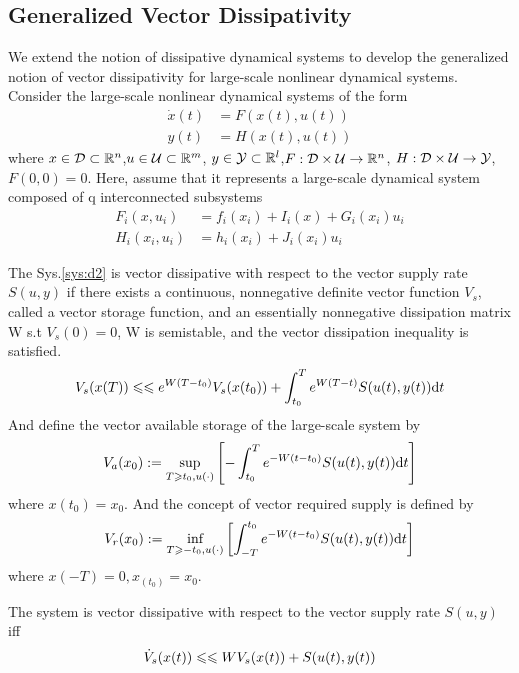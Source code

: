 \documentclass{paper}
\begin{document}
\subsection{Generalized Vector Dissipativity}
We extend the notion of dissipative dynamical systems to develop the generalized notion of vector dissipativity for large-scale nonlinear
dynamical systems. Consider the large-scale nonlinear dynamical systems of the form
\begin{align}\label{sys:d2}
\dot{x}(t)&=F(x(t),u(t)) \\
y(t)&=H(x(t),u(t))
\end{align}
where $x\in\mathcal{D}\subset \mathbb{R}^{n}$,$u\in\mathcal{U}\subset\mathbb{R}^{m}$, $y\in\mathcal{Y}\subset\mathbb{R}^{l}$,$F:\mathcal{D}\times\mathcal{U}\rightarrow\mathbb{R}^{n}$,
${H}:{\mathcal{D}\times\mathcal{U}}\rightarrow{\mathcal{Y}}$, $F(0,0)=0$. Here, assume that it represents a large-scale dynamical system composed of q
interconnected subsystems
\begin{align}
F_i(x,u_i)&=f_i(x_i)+I_i(x)+G_i(x_i)u_i \\
H_i(x_i,u_i)&=h_i(x_i)+J_i(x_i)u_i
\end{align}
\begin{defi}
The Sys.\ref{sys:d2} is vector dissipative with respect to the vector supply rate $S(u,y)$ if there exists a continuous, nonnegative
definite vector function $V_s$, called a vector storage function, and an essentially nonnegative dissipation matrix W s.t $V_s(0)=0$,
W is semistable, and the vector dissipation inequality is satisfied.
\begin{equation}
V_s(x(T))\leqslant\leqslant e^{W(T-t_0)}V_s(x(t_0))+\int_{t_0}^{T}e^{W(T-t)}S(u(t),y(t))\text{d} t
\end{equation}
And define the vector available storage of the large-scale system by
\begin{equation}
V_a(x_0):=\underset{T\geqslant t_0,u(\cdot)}{\text{sup}}\left[-\int_{t_0}^{T}e^{-W(t-t_0)}S(u(t),y(t))\text{d} t\right]
\end{equation}
where $x(t_0)=x_0$. And the concept of vector required supply is defined by
\begin{equation}
V_r(x_0):=\underset{T\geqslant -t_0,u(\cdot)}{\text{inf}}\left[\int_{-T}^{t_0}e^{-W(t-t_0)}S(u(t),y(t))\text{d} t\right]
\end{equation}
where $x(-T)=0,x_(t_0)=x_0$.
\end{defi}
\begin{lem}
The system is vector dissipative with respect to the vector supply rate $S(u,y)$ iff 
\begin{equation}
\dot{V}_s(x(t))\leqslant\leqslant WV_s(x(t))+S(u(t),y(t))
\end{equation}
\end{lem}
\end{document}
